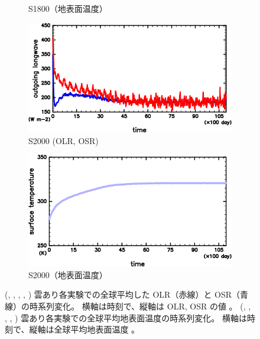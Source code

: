 \documentclass[body]{subfiles}
\begin{document}
\begin{figure}[t]
\begin{subfigure}{.4\textwidth}
		\caption{S1800（地表面温度）}\label{S1800_SurfTemp}
	\end{subfigure}
	\begin{subfigure}{.4\textwidth}
		\centering
		\includegraphics[width=\textwidth]{S2000/S2000_OLRA-OSRA_horimean_time0.0-10950.0-crop.png}
		\caption{S2000 (OLR, OSR)}\label{S2000_OLRA}
	\end{subfigure}
	\begin{subfigure}{.4\textwidth}
		\centering
		\includegraphics[width=\textwidth]{S2000/S2000_SurfTemp_horimean_time0.0-10950.0-crop.png}
		\caption{S2000（地表面温度）}\label{S2000_SurfTemp}
	\end{subfigure}
	\caption[雲あり各実験での全球平均 OLR, OSR, 地表面温度の時系列変化]{
		(, , ,
		, )
		雲あり各実験での全球平均した OLR（赤線）と OSR（青線）の時系列変化。
		横軸は時刻で、縦軸は OLR, OSR の値 \hmu*{[W/m^{2}]}。
		(, , ,
		, )
		雲あり各実験での全球平均地表面温度の時系列変化。
		横軸は時刻で、縦軸は全球平均地表面温度 \hmu*{[K]}。
	}\label{time}
\end{figure}
\end{document}
